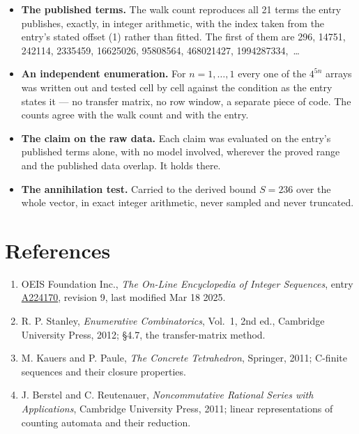 \documentclass[11pt]{article}
\theoremstyle{definition}
\begin{document}
\begin{itemize}

\item {\bfseries The published terms.} The walk count reproduces all 21 terms the entry publishes, exactly, in integer arithmetic, with the index taken from the entry's stated offset (1) rather than fitted. The first of them are 296, 14751, 242114, 2335459, 16625026, 95808564, 468021427, 1994287334,~\dots

\item {\bfseries An independent enumeration.} For $n = 1,\dots,1$ every one of the $4^{5n}$ arrays was written out and tested cell by cell against the condition as the entry states it --- no transfer matrix, no row window, a separate piece of code. The counts agree with the walk count and with the entry.

\item {\bfseries The claim on the raw data.} Each claim was evaluated on the entry's published terms alone, with no model involved, wherever the proved range and the published data overlap. It holds there.

\item {\bfseries The annihilation test.} Carried to the derived bound $S = 236$ over the whole vector, in exact integer arithmetic, never sampled and never truncated.

\end{itemize}

\section{References}

\begin{enumerate}

\item OEIS Foundation Inc., \emph{The On-Line Encyclopedia of Integer Sequences}, entry \href{https://oeis.org/A224170}{A224170}, revision 9, last modified Mar 18 2025.

\item R. P. Stanley, \emph{Enumerative Combinatorics}, Vol.~1, 2nd ed., Cambridge University Press, 2012; \S4.7, the transfer-matrix method.

\item M. Kauers and P. Paule, \emph{The Concrete Tetrahedron}, Springer, 2011; C-finite sequences and their closure properties.

\item J. Berstel and C. Reutenauer, \emph{Noncommutative Rational Series with Applications}, Cambridge University Press, 2011; linear representations of counting automata and their reduction.

\end{enumerate}
\end{document}
